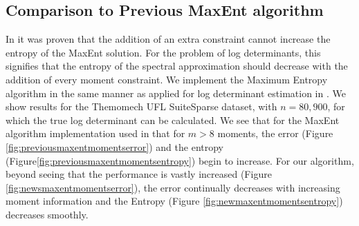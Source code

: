 \documentclass[letterpaper]{article} %
\begin{document}
\subsection{Comparison to Previous MaxEnt algorithm}
In \cite{Granziol2017} it was proven that the addition of an extra constraint cannot increase the entropy of the MaxEnt solution. For the problem of log determinants, this signifies that the entropy of the spectral approximation should decrease with the addition of every moment constraint. We implement the Maximum Entropy algorithm \cite{bandyopadhyay2005maximum} in the same manner as applied for log determinant estimation in \cite{ete}. We show results for the Themomech UFL SuiteSparse dataset, with $n=80,900$, for which the true log determinant can be calculated. We see that for the MaxEnt algorithm \cite{bandyopadhyay2005maximum} implementation used in\cite{ete} that for $m > 8$ moments, the error (Figure \ref{fig:previousmaxentmomentserror}) and the entropy (Figure\ref{fig:previousmaxentmomentsentropy}) begin to increase. For our algorithm, beyond seeing that the performance is vastly increased (Figure \ref{fig:newsmaxentmomentserror}), the error continually decreases with increasing moment information and the Entropy (Figure \ref{fig:newmaxentmomentsentropy}) decreases smoothly.
\end{document}
